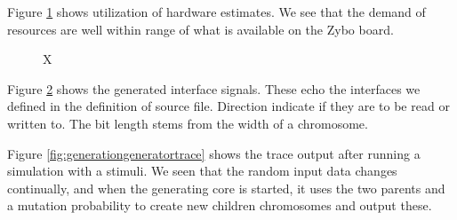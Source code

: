 Figure \ref{fig:ggutilizationestimates} shows utilization of hardware estimates. We see that the demand of resources are well within range of what is available on the Zybo board. 

\begin{figure}[htbp]
	\centering
	\caption{X}
	\label{fig:ggutilizationestimates}
\end{figure}

Figure \ref{fig:gginterface} shows the generated interface signals. These echo the interfaces we defined in the definition of source file. Direction indicate if they are to be read or written to. The bit length stems from the width of a chromosome.

\begin{figure}[htbp]
	\centering
	\caption{}
	\label{fig:gginterface}
\end{figure}

Figure \ref{fig:generationgeneratortrace} shows the trace output after running a simulation with a stimuli. We seen that the random input data changes continually, and when the generating core is started, it uses the two parents and a mutation probability to create new children chromosomes and output these.

